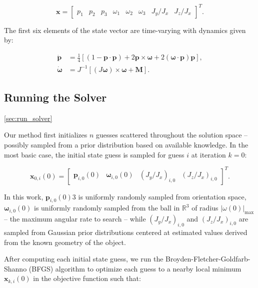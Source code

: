 \documentclass[a4paper,twocolumn]{spaceDebrisC} %
\newcommand{\vctr}[1]{\bm{#1}}
\begin{document}
\begin{equation}
 \vctr{x} = \begin{bmatrix} 
 p_1 & p_2 & p_3 & \omega_1 & \omega_2 & \omega_3 & J_y / J_x & J_z / J_x
  \end{bmatrix}^T.
\end{equation}

The first six elements of the state vector are time-varying with dynamics given by:

\begin{align}
 \vctr{\dot{p}} &= \frac{1}{4} \left[ \left(1 - \vctr{p} \cdot \vctr{p}\right) + 2\vctr{p} \times \vctr{\omega} + 2 \left(\vctr{\omega} \cdot \vctr{p} \right)\vctr{p} \right], \label{eq:mrp_kde} \\
 \vctr{\dot{\omega}} &= J^{-1} \left[ \left(J \vctr{\omega}\right) \times \vctr{\omega} + \vctr{M}\right]. \label{eq:rbtf_dynamics}
\end{align}

\subsection{Running the Solver} \ref{sec:run_solver}

Our method first initializes $n$ guesses scattered throughout the solution space -- possibly sampled from a prior distribution based on available knowledge. In the most basic case, the initial state guess is sampled for guess $i$ at iteration $k=0$:

\begin{equation}
  \vctr{x}_{0,i}(0) = \begin{bmatrix}\vctr{p}_{i,0}(0) & \vctr{\omega}_{i,0}(0) & \left(J_y / J_x\right)_{i,0} & \left(J_z / J_x\right)_{i,0}\end{bmatrix}^T.
\end{equation}

\noindent
In this work, $\vctr{p}_{i,0}(0)3$ is uniformly randomly sampled from orientation space, $\vctr{\omega}_{i,0}(0)$ is uniformly randomly sampled from the ball in $\mathbb{R}^3$ of radius $|\omega(0)|_\text{max}$ -- the maximum angular rate to search -- while $\left(J_y / J_x\right)_{i,0}$ and $\left(J_z / J_x\right)_{i,0}$ are sampled from Gaussian prior distributions centered at estimated values derived from the known geometry of the object.

After computing each initial state guess, we run the Broyden-Fletcher-Goldfarb-Shanno (BFGS) algorithm \cite{broyden1970, fletcher1970, goldfarb1970, shanno1970} to optimize each guess to a nearby local minimum $\vctr{x}_{k,i}(0)$ in the objective function such that:
\end{document}
